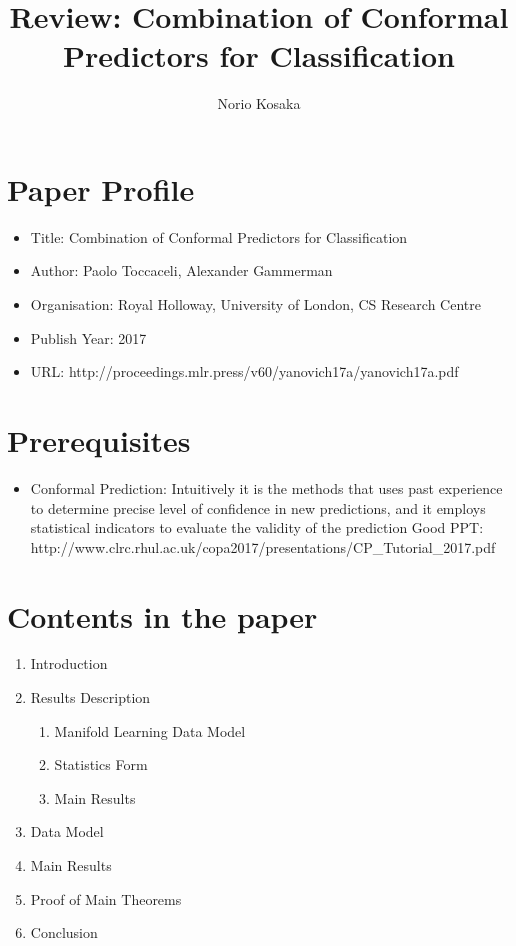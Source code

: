 \documentclass[10pt,a4paper]{article}
\author{Norio Kosaka}
\title{Review: Combination of Conformal Predictors for Classification}
\begin{document}
\maketitle

\section{Paper Profile}
\begin{itemize}
\item Title: Combination of Conformal Predictors for Classification
\item Author: Paolo Toccaceli, Alexander Gammerman
\item Organisation: Royal Holloway, University of London, CS Research Centre
\item Publish Year: 2017
\item URL: http://proceedings.mlr.press/v60/yanovich17a/yanovich17a.pdf
\end{itemize}

\section{Prerequisites}
\begin{itemize}
    \item Conformal Prediction: Intuitively it is the methods that uses past experience to determine precise level of confidence in new predictions, and it employs statistical indicators to evaluate the validity of the prediction
    Good PPT: http://www.clrc.rhul.ac.uk/copa2017/presentations/CP{\_}Tutorial{\_}2017.pdf
\end{itemize}

\section{Contents in the paper}
\begin{enumerate}
\item Introduction
\item Results Description
    \begin{enumerate}
        \item Manifold Learning Data Model
        \item Statistics Form
        \item Main Results
    \end{enumerate}
\item Data Model
\item Main Results
\item Proof of Main Theorems
\item Conclusion
\end{enumerate}
\end{document}
